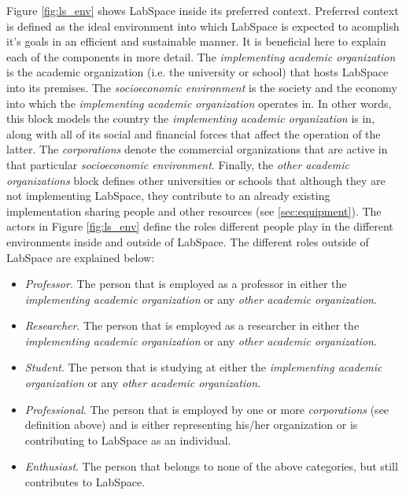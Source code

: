 \documentclass[a4paper, 11pt]{article}
\begin{document}
Figure \ref{fig:ls_env} shows LabSpace inside its preferred context. Preferred context is defined as the ideal environment into which LabSpace is expected to acomplish it's goals in an efficient and sustainable manner. It is beneficial here to explain each of the components in more detail. The \textit{implementing academic organization} is the academic organization (i.e. the university or school) that hosts LabSpace into its premises. The \textit{socioeconomic environment} is the society and the economy into which the \textit{implementing academic organization} operates in. In other words, this block models the country the \textit{implementing academic organization} is in, along with all of its social and financial forces that affect the operation of the latter. The \textit{corporations} denote the commercial organizations that are active in that particular \textit{socioeconomic environment}. Finally, the \textit{other academic organizations} block defines other universities or schools that although they are not implementing LabSpace, they contribute to an already existing implementation sharing people and other resources (see \ref{sec:equipment}). The actors in Figure \ref{fig:ls_env} define the roles different people play in the different environments inside and outside of LabSpace. 
The different roles outside of LabSpace are explained below:

\begin{itemize}[noitemsep]
    \item \textit{Professor}. The person that is employed as a professor in either the \textit{implementing academic organization} or any \textit{other academic organization}.
    \item \textit{Researcher}. The person that is employed as a researcher in either the \textit{implementing academic organization} or any \textit{other academic organization}.
    \item \textit{Student}. The person that is studying at either the \textit{implementing academic organization} or any \textit{other academic organization}.
    \item \textit{Professional}. The person that is employed by one or more \textit{corporations} (see definition above) and is either representing his/her organization or is contributing to LabSpace as an individual.
    \item \textit{Enthusiast}. The person that belongs to none of the above categories, but still contributes to LabSpace.
\end{itemize}
\end{document}
